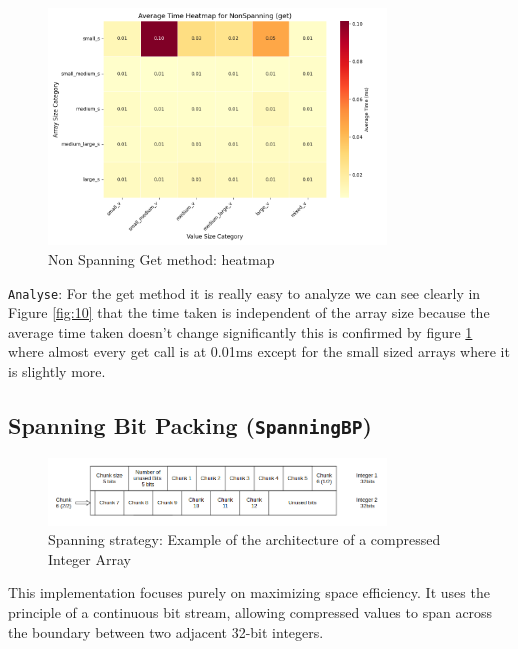 \documentclass[11pt, a4paper]{article}
\begin{document}
	\begin{figure}[H]%
		\centering
		\includegraphics[width=0.8\textwidth]{Grafics/NonSpanning/NonSpanningGetHeat.png}
		\caption{Non Spanning Get method: heatmap}
		\label{fig:11}
	\end{figure}
	\texttt{Analyse}: For the get method it is really easy to analyze we can see clearly in Figure \ref{fig:10} that the time taken is independent of the array size because the average time taken doesn't change significantly this is confirmed by figure \ref{fig:11} where almost every get call is at 0.01ms except for the small sized arrays where it is slightly more.
	
	
	\subsection{Spanning Bit Packing (\texttt{SpanningBP})}
	\label{sec:spanning_bp}
	
	\begin{figure}[h]
		\centering
		\includegraphics[width=0.8\textwidth]{Grafics/spanning.png}
		\caption{Spanning strategy: Example of the architecture of a compressed Integer Array}
		\label{fig:spanning_arch}
	\end{figure}
	
	This implementation focuses purely on maximizing space efficiency. It uses the principle of a continuous bit stream, allowing compressed values to span across the boundary between two adjacent 32-bit integers.
	
\end{document}
